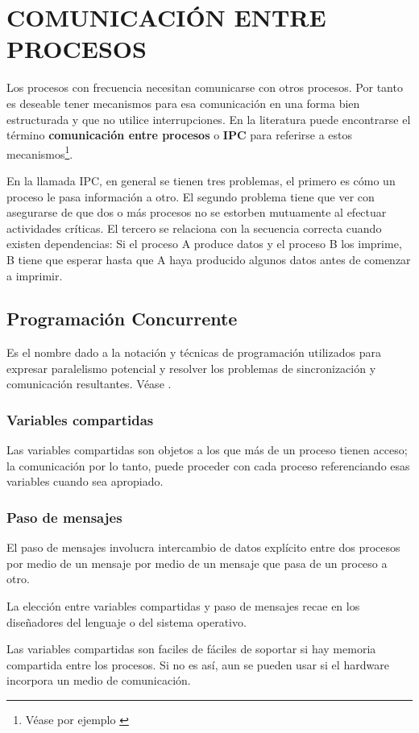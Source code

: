 \documentclass{article}
\begin{document}
\section{COMUNICACI\'ON ENTRE PROCESOS}
Los procesos con frecuencia necesitan comunicarse con otros 
procesos. Por tanto es deseable tener mecanismos para esa 
comunicaci\'on en una forma bien estructurada y que no 
utilice interrupciones. En la literatura puede encontrarse el 
t\'ermino {\bf comunicaci\'on entre procesos} o {\bf IPC} 
para referirse a estos mecanismos\footnote{V\'ease por ejemplo
\cite{Tanenbaum}}.

En la llamada IPC, en general se tienen tres problemas, el 
primero es c\'omo un proceso le pasa informaci\'on a otro. El 
segundo problema tiene que ver con asegurarse de que dos o 
m\'as procesos no se estorben mutuamente al efectuar 
actividades cr\'iticas. El tercero se relaciona con la 
secuencia correcta cuando existen dependencias: Si el proceso 
A produce datos y el proceso B los imprime, B tiene que esperar 
hasta que A haya producido algunos datos antes de comenzar a 
imprimir.
\subsection*{Programaci\'on Concurrente}
Es el nombre dado a la notaci\'on y t\'ecnicas de programaci\'on 
utilizados para expresar paralelismo potencial y resolver los 
problemas de sincronizaci\'on y comunicaci\'on resultantes. 
V\'ease \cite{Burns}.
\subsubsection*{Variables compartidas}
Las variables compartidas son objetos a los que m\'as de un 
proceso tienen acceso; la comunicaci\'on por lo tanto, puede 
proceder con cada proceso referenciando esas variables cuando 
sea apropiado.
\subsubsection*{Paso de mensajes}
El paso de mensajes involucra intercambio de datos expl\'icito 
entre dos procesos por medio de un mensaje por medio de un mensaje 
que pasa de un proceso a otro.

La elecci\'on entre variables compartidas y paso de mensajes 
recae en los dise\~nadores del lenguaje o del sistema operativo.

Las variables compartidas son faciles de f\'aciles de soportar 
si hay memoria compartida entre los procesos. Si no es as\'i, 
aun se pueden usar si el hardware incorpora un medio de 
comunicaci\'on.
\end{document}
